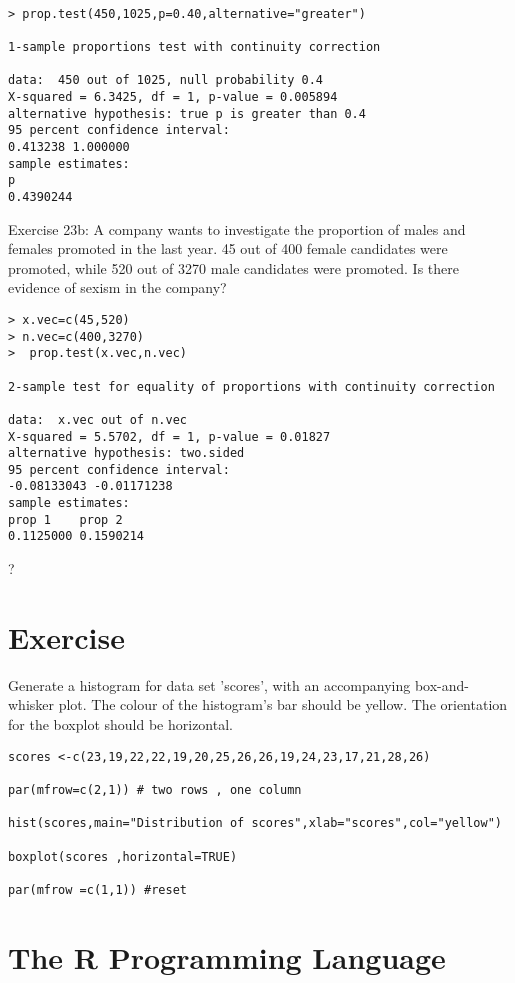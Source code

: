 \begin{itemize}
\begin{verbatim}

> prop.test(450,1025,p=0.40,alternative="greater")

1-sample proportions test with continuity correction

data:  450 out of 1025, null probability 0.4
X-squared = 6.3425, df = 1, p-value = 0.005894
alternative hypothesis: true p is greater than 0.4
95 percent confidence interval:
0.413238 1.000000
sample estimates:
p
0.4390244
\end{verbatim}

Exercise 23b:  A company wants to investigate the proportion of males and females promoted in the last year. 45 out of 400 female candidates were promoted, while 520 out of 3270 male candidates were promoted. Is there evidence of sexism in the company?
\begin{verbatim}
> x.vec=c(45,520)
> n.vec=c(400,3270)
>  prop.test(x.vec,n.vec)

2-sample test for equality of proportions with continuity correction

data:  x.vec out of n.vec
X-squared = 5.5702, df = 1, p-value = 0.01827
alternative hypothesis: two.sided
95 percent confidence interval:
-0.08133043 -0.01171238
sample estimates:
prop 1    prop 2
0.1125000 0.1590214
\end{verbatim}

?
\section{Exercise}

Generate a histogram for data set 'scores', with an accompanying box-and-whisker plot.
The colour of the histogram's bar should be yellow. The orientation for the boxplot should be horizontal.

\begin{verbatim}
scores <-c(23,19,22,22,19,20,25,26,26,19,24,23,17,21,28,26)

par(mfrow=c(2,1)) # two rows , one column

hist(scores,main="Distribution of scores",xlab="scores",col="yellow")

boxplot(scores ,horizontal=TRUE)

par(mfrow =c(1,1)) #reset
\end{verbatim}
\section{The R Programming Language}


\end{itemize}
